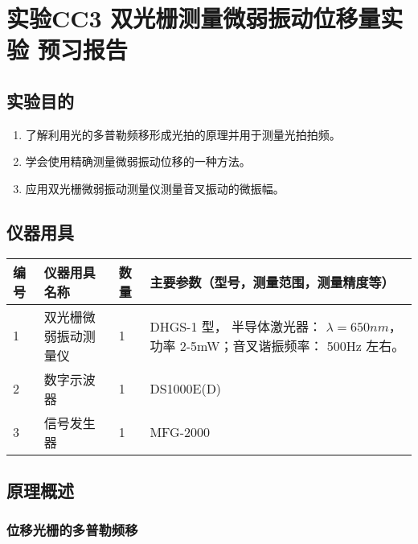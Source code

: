\documentclass[dvipsnames, svgnames,a4paper,11pt]{article}
\begin{document}
\clearpage
\tableofcontents
\clearpage

\setcounter{section}{0}
\section{实验CC3 \quad 双光栅测量微弱振动位移量实验 \quad\heiti 预习报告}
	
\subsection{实验目的}
\begin{enumerate}
	\item 了解利用光的多普勒频移形成光拍的原理并用于测量光拍拍频。
	\item 学会使用精确测量微弱振动位移的一种方法。
	\item 应用双光栅微弱振动测量仪测量音叉振动的微振幅。
	
\end{enumerate}

\subsection{仪器用具}
\begin{table}[htbp]
	\centering
	\renewcommand\arraystretch{1.6}
	\begin{tabular}{p{}|p{}|p{}|p{}}
	\hline
	编号& 仪器用具名称 & 数量 &  主要参数（型号，测量范围，测量精度等） \\
	\hline
	1&双光栅微弱振动测量仪 	&1 	& DHGS-1 型， 半导体激光器： $\lambda=650nm$，功率 2-5mW；音叉谐振频率： 500Hz 左右。\\

	2&数字示波器 	&1 	& DS1000E(D) \\
	
	3&信号发生器 &1 & MFG-2000\\
	
	\hline
\end{tabular}
\end{table}

\subsection{原理概述}

	\subsubsection{位移光栅的多普勒频移}
\end{document}
